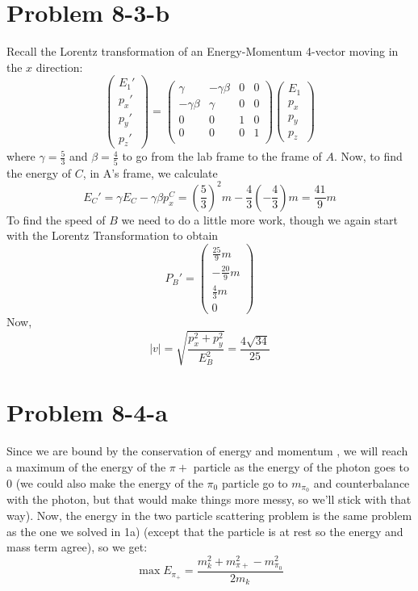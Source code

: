 \section*{Problem 8-3-b}
Recall the Lorentz transformation of an Energy-Momentum 4-vector moving in the $x$ direction:
\[
\begin{pmatrix}
E_1' \\ p_x' \\ p_y' \\ p_z'
\end{pmatrix} = \begin{pmatrix}
\gamma & - \gamma\beta & 0 & 0 \\
 - \gamma\beta & \gamma & 0 & 0 \\
 0 & 0 & 1 & 0 \\
 0 & 0 & 0 & 1 \\
\end{pmatrix} \begin{pmatrix}
E_1 \\ p_x \\ p_y \\ p_z
\end{pmatrix}
\]
where $\gamma = \frac{5}{3}$ and $\beta=\frac{4}{5}$ to go from the lab frame to the frame of $A$. 
Now, to find the energy of $C$, in A's frame, we calculate 
\[ E_C' = \gamma E_C - \gamma\beta p^C_x = \left(\frac{5}{3}\right)^2 m -\frac{4}{3}\left(-\frac{4}{3}\right)m = \frac{41}{9} m \]
To find the speed of $B$ we need to do a little more work, though we again start with the Lorentz Transformation to obtain
\[ P_B' = \begin{pmatrix}
\frac{25}{9}m \\ -\frac{20}{9}m \\ \frac{4}{3}m \\ 0 
\end{pmatrix} \]
Now, 
\[ |v| = \sqrt{\frac{p_x^2+p_y^2}{E_B^2}} = \frac{4\sqrt{34}}{25} \]
\section*{Problem 8-4-a}
Since we are bound by the conservation of energy and momentum , we will reach a maximum of the energy of the $\pi+$ particle as the energy of the photon goes to $0$ (we could also make the energy of the $\pi_0$ particle go to $m_{\pi_0}$ and counterbalance with the photon, but that would make things more messy, so we'll stick with that way). Now, the energy in the two particle scattering problem is the same problem as the one we solved in 1a) (except that the particle is at rest so the energy and mass term agree), so we get:
\[ \max E_{\pi_+} = \frac{m_k^2 + m_{\pi+}^2 - m_{\pi_0}^2}{2m_k} \]
